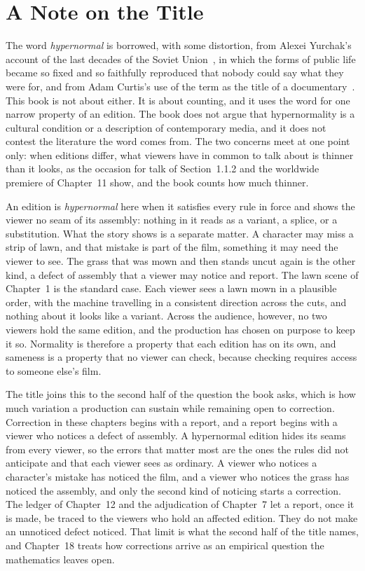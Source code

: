 \chapter*{A Note on the Title}

The word \emph{hypernormal} is borrowed, with some distortion, from Alexei Yurchak's account of the last decades of the Soviet Union~\cite{yurchak2006}, in which the forms of public life became so fixed and so faithfully reproduced that nobody could say what they were for, and from Adam Curtis's use of the term as the title of a documentary~\cite{curtis2016}. This book is not about either. It is about counting, and it uses the word for one narrow property of an edition. The book does not argue that hypernormality is a cultural condition or a description of contemporary media, and it does not contest the literature the word comes from. The two concerns meet at one point only: when editions differ, what viewers have in common to talk about is thinner than it looks, as the occasion for talk of Section~1.1.2 and the worldwide premiere of Chapter~11 show, and the book counts how much thinner.

An edition is \emph{hypernormal} here when it satisfies every rule in force and shows the viewer no seam of its assembly: nothing in it reads as a variant, a splice, or a substitution. What the story shows is a separate matter. A character may miss a strip of lawn, and that mistake is part of the film, something it may need the viewer to see. The grass that was mown and then stands uncut again is the other kind, a defect of assembly that a viewer may notice and report. The lawn scene of Chapter~1 is the standard case. Each viewer sees a lawn mown in a plausible order, with the machine travelling in a consistent direction across the cuts, and nothing about it looks like a variant. Across the audience, however, no two viewers hold the same edition, and the production has chosen on purpose to keep it so. Normality is therefore a property that each edition has on its own, and sameness is a property that no viewer can check, because checking requires access to someone else's film.

The title joins this to the second half of the question the book asks, which is how much variation a production can sustain while remaining open to correction. Correction in these chapters begins with a report, and a report begins with a viewer who notices a defect of assembly. A hypernormal edition hides its seams from every viewer, so the errors that matter most are the ones the rules did not anticipate and that each viewer sees as ordinary. A viewer who notices a character's mistake has noticed the film, and a viewer who notices the grass has noticed the assembly, and only the second kind of noticing starts a correction. The ledger of Chapter~12 and the adjudication of Chapter~7 let a report, once it is made, be traced to the viewers who hold an affected edition. They do not make an unnoticed defect noticed. That limit is what the second half of the title names, and Chapter~18 treats how corrections arrive as an empirical question the mathematics leaves open.

